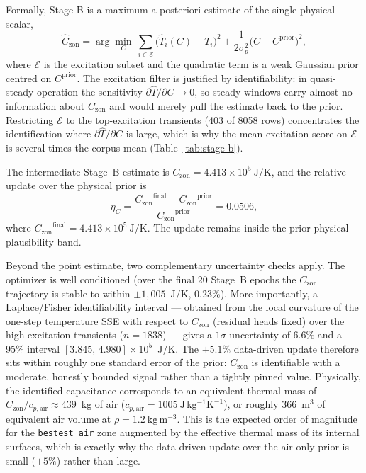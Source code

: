 \documentclass[11pt,a4paper]{article}
\newcommand{\Czon}{\ensuremath{C_{\mathrm{zon}}}}
\newcommand{\That}{\ensuremath{\widehat{T}}}
\begin{document}
Formally, Stage B is a maximum-a-posteriori estimate of the single physical scalar,
\begin{equation}
  \hat C_{\mathrm{zon}}
  = \arg\min_{C}\ \sum_{i\in\mathcal{E}}\big(\That_i(C)-T_i\big)^2
  + \frac{1}{2\sigma_p^2}\big(C-C^{\mathrm{prior}}\big)^2,
  \label{eq:stageb-map}
\end{equation}
where \(\mathcal{E}\) is the excitation subset and the quadratic term is a weak Gaussian prior centred on \(C^{\mathrm{prior}}\). The excitation filter is justified by identifiability: in quasi-steady operation the sensitivity \(\partial\That/\partial C\to 0\), so steady windows carry almost no information about \(\Czon\) and would merely pull the estimate back to the prior. Restricting \(\mathcal{E}\) to the top-excitation transients (403 of 8058 rows) concentrates the identification where \(\partial\That/\partial C\) is large, which is why the mean excitation score on \(\mathcal{E}\) is several times the corpus mean (Table~\ref{tab:stage-b}).

The intermediate Stage~B estimate is \(\Czon=4.413\times10^5~\mathrm{J/K}\), and the relative update over the physical prior is
\begin{equation}
  \eta_C =
  \frac{\Czon^{\mathrm{final}}-\Czon^{\mathrm{prior}}}{\Czon^{\mathrm{prior}}}
  = 0.0506,
\end{equation}
where \(\Czon^{\mathrm{final}}=4.413 \times 10^5~\mathrm{J/K}\). The update remains inside the prior physical plausibility band.

Beyond the point estimate, two complementary uncertainty checks apply. The optimizer is well conditioned (over the final 20 Stage~B epochs the \(\Czon\) trajectory is stable to within \(\pm1,005\)~J/K, 0.23\%). More importantly, a Laplace/Fisher identifiability interval --- obtained from the local curvature of the one-step temperature SSE with respect to \(\Czon\) (residual heads fixed) over the high-excitation transients (\(n=1838\)) --- gives a \(1\sigma\) uncertainty of 6.6\% and a 95\% interval \([3.845,\,4.980]\times10^5\)~J/K. The \(+5.1\%\) data-driven update therefore sits within roughly one standard error of the prior: \(\Czon\) is identifiable with a moderate, honestly bounded signal rather than a tightly pinned value. Physically, the identified capacitance corresponds to an equivalent thermal mass of \(\Czon/c_{p,\mathrm{air}}\approx439\)~kg of air (\(c_{p,\mathrm{air}}=1005~\mathrm{J\,kg^{-1}K^{-1}}\)), or roughly 366~m\(^3\) of equivalent air volume at \(\rho=1.2~\mathrm{kg\,m^{-3}}\). This is the expected order of magnitude for the \texttt{bestest\_air} zone augmented by the effective thermal mass of its internal surfaces, which is exactly why the data-driven update over the air-only prior is small (\(+5\%\)) rather than large.
\end{document}
